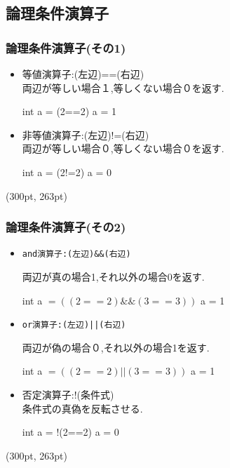 \documentclass[dvipdfmx]{beamer}
\begin{document}
\subsection{論理条件演算子}
\begin{frame}[c, fragile, label=19]
    \frametitle{論理条件演算子(その1)}
    \begin{itemize}
        \item 等値演算子:(左辺)==(右辺)\\
            \qquad 両辺が等しい場合１,等しくない場合０を返す.
            \begin{block}{int a = (2==2)}
                a = 1
            \end{block}
        \item 非等値演算子:(左辺)!=(右辺)\\
            \qquad 両辺が等しい場合０,等しくない場合０を返す.
            \begin{block}{int a = (2!=2)}
                a = 0
            \end{block}
    \end{itemize}
    \begin{textblock*}{0.3\linewidth}(300pt, 263pt)
    \hyperlink{18}{}
    \space
    \hyperlink{20}{}
    \end{textblock*}
\end{frame}

\begin{frame}[c, fragile, label=20]
    \frametitle{論理条件演算子(その2)}
    \begin{itemize}
        \item \begin{verbatim}and演算子:(左辺)&&(右辺)\end{verbatim}
            \qquad 両辺が真の場合1,それ以外の場合0を返す.
            \begin{block}{int a $= ((2==2)\&\& (3==3))$}
                a = 1
            \end{block}
        \item \begin{verbatim}or演算子:(左辺)||(右辺)\end{verbatim}
            \qquad 両辺が偽の場合０,それ以外の場合1を返す.
            \begin{block}{int a $= ((2==2) \lvert\rvert  (3==3))$}
                a = 1
            \end{block}
        \item 否定演算子:!(条件式)\\
            \qquad 条件式の真偽を反転させる.
            \begin{block}{int a = !(2==2)}
                    a = 0
            \end{block}
    \end{itemize}
    \begin{textblock*}{0.3\linewidth}(300pt, 263pt)
    \hyperlink{19}{}
    \space
    \hyperlink{21}{}
    \end{textblock*}
\end{frame}
\end{document}
